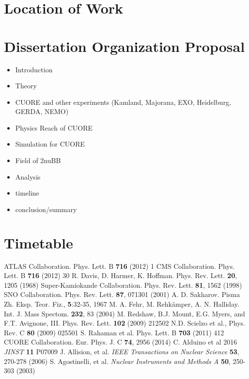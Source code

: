 \documentclass[12pt,a4paper]{article}
\begin{document}
\section{Location of Work}

\section{Dissertation Organization Proposal}

\begin{itemize}
\item Introduction \checkmark
\item Theory \checkmark
\item CUORE and other experiments (Kamland, Majorana, EXO, Heidelburg, GERDA, NEMO)
\item Physics Reach of CUORE
\item Simulation for CUORE
\item Field of 2nuBB 
\item Analysis
\item timeline
\item conclusion/summary
\end{itemize}


\section{Timetable}

\newpage

\begin{thebibliography}{8}
ATLAS Collaboration. Phys. Lett. B \textbf{716} (2012) 1
CMS Collaboration. Phys. Lett. B \textbf{716} (2012) 30
R. Davis, D. Harmer, K. Hoffman. Phys. Rev. Lett. \textbf{20}, 1205 (1968)
 Super-Kamiokande Collaboration. Phys. Rev. Lett. \textbf{81}, 1562 (1998)
SNO Collaboration. Phys. Rev. Lett. \textbf{87}, 071301 (2001)
A. D. Sakharov. Pisma Zh. Eksp. Teor. Fiz., \textbf{5}:32-35, 1967
M. A. Fehr, M. Rehk{\"a}mper, A. N. Halliday. Int. J. Mass Spectom. \textbf{232}, 83 (2004)
M. Redshaw, B.J. Mount, E.G. Myers, and F.T. Avignone, III. Phys. Rev. Lett. \textbf{102} (2009) 212502
N.D. Scielzo et al., Phys. Rev. C \textbf{80} (2009) 025501
S. Rahaman et al. Phys. Lett. B \textbf{703} (2011) 412
CUORE Collaboration. Eur. Phys. J. C \textbf{74}, 2956 (2014)
C. Alduino et al 2016 \textit{JINST} \textbf{11} P07009
J. Allision, et al. \textit{IEEE Transactions on Nuclear Science} \textbf{53}, 270-278 (2006)
S. Agostinelli, et al. \textit{Nuclear Instruments and Methods A} \textbf{50}, 250-303 (2003)

\end{thebibliography}
\end{document}
